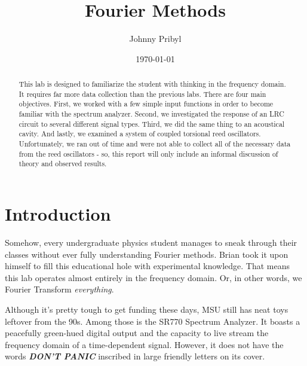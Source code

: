 \documentclass{article}
\date{\today} %
\begin{document}
\title{Fourier Methods}
\author{Johnny Pribyl}
\maketitle

\begin{abstract}

    This lab is designed to familiarize the student with thinking in the
    frequency domain. It requires far more data collection than the previous
    labs. There are four main objectives. First, we worked with a few simple
    input functions in order to become familiar with the spectrum analyzer.
    Second, we investigated the response of an LRC circuit to several different
    signal types. Third, we did the same thing to an acoustical cavity. And
    lastly, we examined a system of coupled torsional reed oscillators.
    Unfortunately, we ran out of time and were not able to collect all of the
    necessary data from the reed oscillators - so, this report will only
    include an informal discussion of theory and observed results.
    
\end{abstract}



\section{Introduction}

Somehow, every undergraduate physics student manages to sneak through their
classes without ever fully understanding Fourier methods. Brian took it upon
himself to fill this educational hole with experimental knowledge. That means
this lab operates almost entirely in the frequency domain. Or, in other words,
we Fourier Transform \textit{everything}.

Although it's pretty tough to get funding these days, MSU still has neat toys
leftover from the 90s. Among those is the SR770 Spectrum Analyzer. It boasts a
peacefully green-hued digital output and the capacity to live stream the
frequency domain of a time-dependent signal. However, it does not have the
words  \textit{\textbf{DON'T PANIC}}  inscribed in large friendly letters on
its cover.
\end{document}
